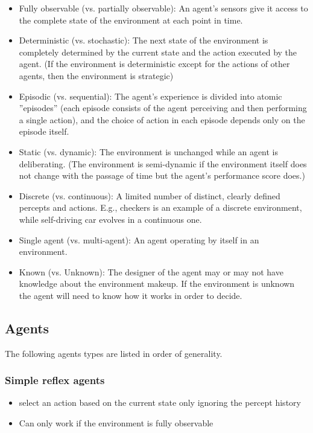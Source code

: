 \begin{itemize}
  \item Fully observable (vs. partially observable): An agent’s
    sensors give it access to the complete state of the
    environment at each point in time.  
  \item Deterministic (vs.  stochastic): The next state of the 
    environment is completely determined by the current state 
    and the action executed by the agent. 
    (If the environment is deterministic except for
    the actions of other agents, then the environment is
    strategic) 
  \item Episodic (vs. sequential): The agent’s
    experience is divided into atomic ”episodes” (each episode
    consists of the agent perceiving and then performing a single
    action), and the choice of action in each episode depends
    only on the episode itself.
  \item Static (vs. dynamic): The environment is unchanged while 
    an agent is deliberating. (The environment is semi-dynamic
    if the environment itself does not change with the passage of
    time but the agent’s performance score does.)
  \item Discrete (vs. continuous): A limited number of distinct,
    clearly defined percepts and actions. E.g., checkers is an example of a discrete environment, while self-driving car evolves
    in a continuous one.
  \item Single agent (vs. multi-agent): An agent operating by itself
    in an environment.
  \item Known (vs. Unknown): The designer of the agent may or
    may not have knowledge about the environment makeup. If
    the environment is unknown the agent will need to know how
    it works in order to decide.
\end{itemize}

\subsection{Agents}

The following agents types are listed in order of generality.

\subsubsection{Simple reflex agents}
\begin{itemize}
  \item select an action based on the current state
    only ignoring the percept history
  \item Can only work if the environment is fully observable
\end{itemize}

